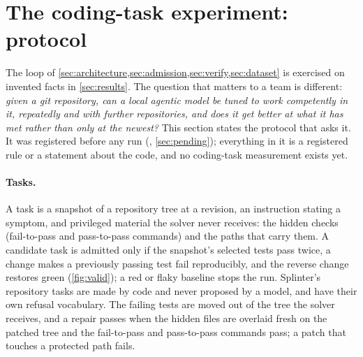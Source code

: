 
\section{The coding-task experiment: protocol}\label{sec:protocol}

The loop of \cref{sec:architecture,sec:admission,sec:verify,sec:dataset} is exercised on
invented facts in \cref{sec:results}. The question that matters to a team is different:
\emph{given a git repository, can a local agentic model be tuned to work competently in
it, repeatedly and with further repositories, and does it get better at what it has met
rather than only at the newest?} This section states the protocol that asks it. It was
registered before any run (, \cref{sec:pending}); everything
in it is a registered rule or a statement about the code, and no coding-task measurement
exists yet.

\paragraph{Tasks.} A task is a snapshot of a repository tree at a revision, an
instruction stating a symptom, and privileged material the solver never receives: the
hidden checks (fail-to-pass and pass-to-pass commands) and the paths that carry them.
A candidate task is admitted only if the snapshot's selected tests pass twice, a change makes
a previously passing test fail reproducibly, and the reverse change restores green
(\cref{fig:valid}); a red or flaky baseline stops the run. Splinter's repository
tasks are made by code and never proposed by a model, and have their own refusal
vocabulary. The failing tests are moved out of the tree the solver receives, and a
repair passes when the hidden files are overlaid fresh on the patched tree and the
fail-to-pass and pass-to-pass commands pass; a patch that touches a protected path
fails.

